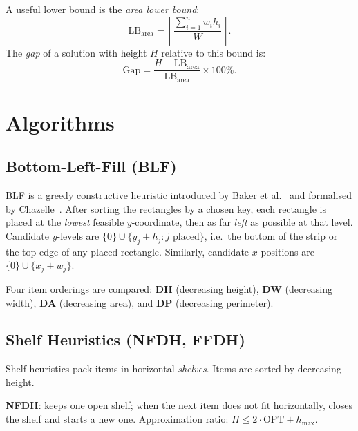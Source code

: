 \documentclass[11pt,a4paper]{article}
\begin{document}
A useful lower bound is the \emph{area lower bound}:
\begin{equation}
\mathrm{LB}_{\text{area}} = \left\lceil \frac{\sum_{i=1}^n w_i h_i}{W} \right\rceil.
\label{eq:lb}
\end{equation}
The \emph{gap} of a solution with height \(H\) relative to this bound is:
\begin{equation}
\mathrm{Gap} = \frac{H - \mathrm{LB}_{\text{area}}}{\mathrm{LB}_{\text{area}}} \times 100\%.
\label{eq:gap}
\end{equation}

\section{Algorithms}

\subsection{Bottom-Left-Fill (BLF)}

BLF is a greedy constructive heuristic introduced by Baker et al.~\cite{Baker1980}
and formalised by Chazelle~\cite{Chazelle1983}.
After sorting the rectangles by a chosen key, each rectangle is placed at
the \emph{lowest} feasible $y$-coordinate, then as far \emph{left} as
possible at that level.
Candidate $y$-levels are $\{0\} \cup \{y_j + h_j : j \text{ placed}\}$, i.e.\
the bottom of the strip or the top edge of any placed rectangle.
Similarly, candidate $x$-positions are $\{0\} \cup \{x_j + w_j\}$.

Four item orderings are compared:
\textbf{DH} (decreasing height), \textbf{DW} (decreasing width),
\textbf{DA} (decreasing area), and \textbf{DP} (decreasing perimeter).

\subsection{Shelf Heuristics (NFDH, FFDH)}

Shelf heuristics \cite{Coffman1980} pack items in horizontal \emph{shelves}.
Items are sorted by decreasing height.

\textbf{NFDH}: keeps one open shelf; when the next item does not fit horizontally,
closes the shelf and starts a new one.
Approximation ratio: $H \le 2 \cdot \mathrm{OPT} + h_{\max}$.
\end{document}
